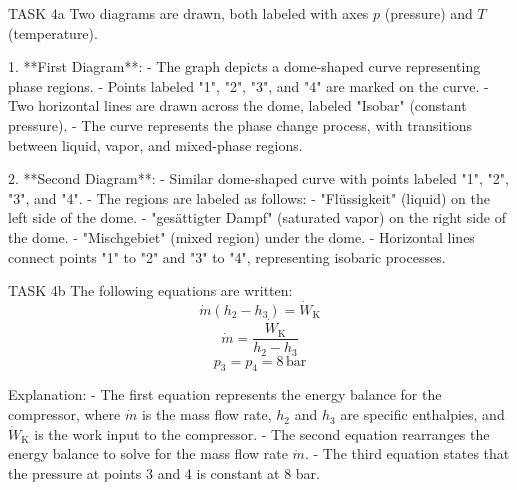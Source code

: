 TASK 4a  
Two diagrams are drawn, both labeled with axes \( p \) (pressure) and \( T \) (temperature).  

1. **First Diagram**:  
   - The graph depicts a dome-shaped curve representing phase regions.  
   - Points labeled "1", "2", "3", and "4" are marked on the curve.  
   - Two horizontal lines are drawn across the dome, labeled "Isobar" (constant pressure).  
   - The curve represents the phase change process, with transitions between liquid, vapor, and mixed-phase regions.  

2. **Second Diagram**:  
   - Similar dome-shaped curve with points labeled "1", "2", "3", and "4".  
   - The regions are labeled as follows:  
     - "Flüssigkeit" (liquid) on the left side of the dome.  
     - "gesättigter Dampf" (saturated vapor) on the right side of the dome.  
     - "Mischgebiet" (mixed region) under the dome.  
   - Horizontal lines connect points "1" to "2" and "3" to "4", representing isobaric processes.  

TASK 4b  
The following equations are written:  
\[
\dot{m}(h_2 - h_3) = \dot{W}_\text{K}
\]  
\[
\dot{m} = \frac{\dot{W}_\text{K}}{h_2 - h_3}
\]  
\[
p_3 = p_4 = 8 \, \text{bar}
\]  

Explanation:  
- The first equation represents the energy balance for the compressor, where \( \dot{m} \) is the mass flow rate, \( h_2 \) and \( h_3 \) are specific enthalpies, and \( \dot{W}_\text{K} \) is the work input to the compressor.  
- The second equation rearranges the energy balance to solve for the mass flow rate \( \dot{m} \).  
- The third equation states that the pressure at points 3 and 4 is constant at 8 bar.